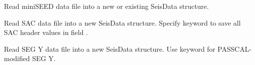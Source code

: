 \documentclass[letterpaper,11pt,english]{sphinxmanual}
\begin{document}
\begin{fulllineitems}
\label{\detokenize{src/Formats/fileformats:readmseed}}
\end{fulllineitems}



\begin{fulllineitems}
\end{fulllineitems}


Read miniSEED data file  into a new or existing SeisData structure.

\begin{fulllineitems}
\label{\detokenize{src/Formats/fileformats:readsac}}
\end{fulllineitems}


\begin{fulllineitems}
\label{\detokenize{src/Formats/fileformats:rsac}}
\end{fulllineitems}


Read SAC data file  into a new SeisData structure. Specify keyword  to save all SAC header values in field .

\begin{fulllineitems}
\label{\detokenize{src/Formats/fileformats:readsegy}}
\end{fulllineitems}


Read SEG Y data file  into a new SeisData structure. Use keyword  for PASSCAL-modified SEG Y.
\end{document}
